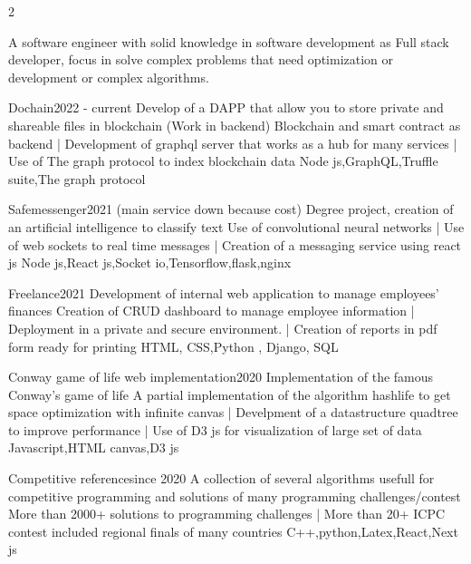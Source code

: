 \documentclass[9.5pt,a4paper,icons,colors]{Resume}
\begin{document}
\begin{paracol}{2}

A software engineer with solid knowledge in software development as Full stack developer, focus in solve complex problems that need optimization or development or complex algorithms.



\cvproject
{Dochain}{2022 - current}
{ }
{Develop of a DAPP that allow you to store private and shareable files in blockchain (Work in backend) }
{Blockchain and smart contract as backend |
Development of graphql server that works as a hub for many services |
Use of The graph protocol to index blockchain data} 
{Node js,GraphQL,Truffle suite,The graph protocol}

\divider

\cvproject
{Safemessenger}{2021}
{ (main service down because cost)}
{Degree project, creation of an artificial intelligence to classify text }
{Use of convolutional neural networks |
Use of web sockets to real time messages |
Creation of a messaging service using react js}
{Node js,React js,Socket io,Tensorflow,flask,nginx}
\divider

\cvproject
{Freelance}{2021}
{}
{Development of internal web application to manage employees' finances}
{Creation of CRUD dashboard to manage employee information | 
Deployment in a private and secure environment. |
Creation of reports in pdf form ready for printing}
{HTML, CSS,Python , Django, SQL}
\divider

\cvproject
{Conway game of life web implementation}{2020}
{}
{Implementation of the famous Conway's game of life}
{A partial implementation of the algorithm hashlife to get space optimization with infinite canvas |
Develpment of a datastructure quadtree to improve performance |
Use of D3 js for visualization of large set of data}
{Javascript,HTML canvas,D3 js}
\divider

\cvproject
{Competitive reference}{since 2020}
{}
{A collection of several algorithms usefull for competitive programming and solutions of many programming challenges/contest}
{More than 2000+ solutions to programming challenges |
More than 20+ ICPC contest included regional finals of many countries}
{C++,python,Latex,React,Next js}


\end{paracol}
\end{document}

